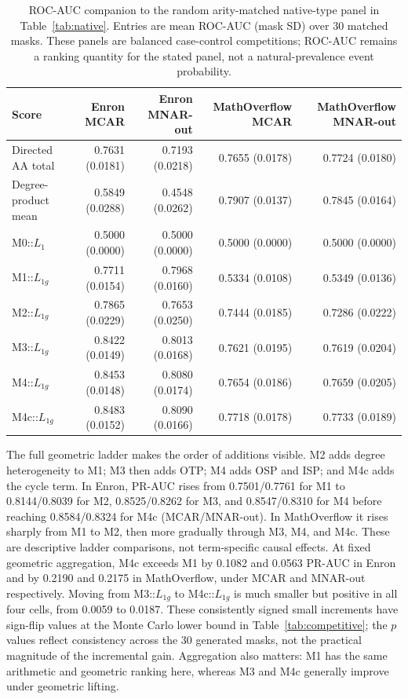 \documentclass[10pt]{article}
\begin{document}
\begin{table}[H]
\centering
\caption{ROC-AUC companion to the random arity-matched native-type panel in Table~\ref{tab:native}. Entries are mean ROC-AUC (mask SD) over 30 matched masks. These panels are balanced case-control competitions; ROC-AUC remains a ranking quantity for the stated panel, not a natural-prevalence event probability.}
\label{tab:primaryroc}
\scriptsize
\setlength{\tabcolsep}{3pt}
\begin{tabular}{@{}lrrrr@{}}
\toprule
Score & Enron MCAR & Enron MNAR-out & MathOverflow MCAR & MathOverflow MNAR-out\\
\midrule
Directed AA total & 0.7631 (0.0181) & 0.7193 (0.0218) & 0.7655 (0.0178) & 0.7724 (0.0180)\\
Degree-product mean & 0.5849 (0.0288) & 0.4548 (0.0262) & 0.7907 (0.0137) & 0.7845 (0.0164)\\
M0::$L_1$ & 0.5000 (0.0000) & 0.5000 (0.0000) & 0.5000 (0.0000) & 0.5000 (0.0000)\\
M1::$L_{1g}$ & 0.7711 (0.0154) & 0.7968 (0.0160) & 0.5334 (0.0108) & 0.5349 (0.0136)\\
M2::$L_{1g}$ & 0.7865 (0.0229) & 0.7653 (0.0250) & 0.7444 (0.0185) & 0.7286 (0.0222)\\
M3::$L_{1g}$ & 0.8422 (0.0149) & 0.8013 (0.0168) & 0.7621 (0.0195) & 0.7619 (0.0204)\\
M4::$L_{1g}$ & 0.8453 (0.0148) & 0.8080 (0.0174) & 0.7654 (0.0186) & 0.7659 (0.0205)\\
M4c::$L_{1g}$ & 0.8483 (0.0152) & 0.8090 (0.0166) & 0.7718 (0.0178) & 0.7733 (0.0189)\\
\bottomrule
\end{tabular}
\end{table}


The full geometric ladder makes the order of additions visible. M2 adds degree heterogeneity to M1; M3 then adds OTP; M4 adds OSP and ISP; and M4c adds the cycle term. In Enron, PR-AUC rises from 0.7501/0.7761 for M1 to 0.8144/0.8039 for M2, 0.8525/0.8262 for M3, and 0.8547/0.8310 for M4 before reaching 0.8584/0.8324 for M4c (MCAR/MNAR-out). In MathOverflow it rises sharply from M1 to M2, then more gradually through M3, M4, and M4c. These are descriptive ladder comparisons, not term-specific causal effects. At fixed geometric aggregation, M4c exceeds M1 by 0.1082 and 0.0563 PR-AUC in Enron and by 0.2190 and 0.2175 in MathOverflow, under MCAR and MNAR-out respectively. Moving from M3::$L_{1g}$ to M4c::$L_{1g}$ is much smaller but positive in all four cells, from 0.0059 to 0.0187. These consistently signed small increments have sign-flip values at the Monte Carlo lower bound in Table~\ref{tab:competitive}; the $p$ values reflect consistency across the 30 generated masks, not the practical magnitude of the incremental gain. Aggregation also matters: M1 has the same arithmetic and geometric ranking here, whereas M3 and M4c generally improve under geometric lifting.
\end{document}

